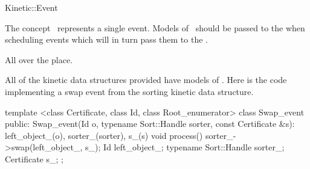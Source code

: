
\begin{ccRefConcept}{Kinetic::Event}


\ccDefinition
  
The concept \ccClassName\ represents a single event. Models of
\ccClassName\ should be passed to the  when
scheduling events which will in turn pass them to the
.


\ccOperations



\ccHasModels

All over the place. 

\ccSeeAlso


\ccExample

All of the kinetic data structures provided have models of
\ccRefName. Here is the code implementing a swap event from the
sorting kinetic data structure.

\begin{ccExampleCode}
template <class Certificate, class Id, class Root_enumerator> 
class Swap_event {
public:
  Swap_event(Id o, typename Sort::Handle sorter, 
	     const Certificate &s): left_object_(o), 
                                    sorter_(sorter), 
                                    s_(s){}
  void process(){
    sorter_->swap(left_object_, s_);
  }
  Id left_object_; 
  typename Sort::Handle sorter_; 
  Certificate s_;
};
\end{ccExampleCode}


\end{ccRefConcept}


